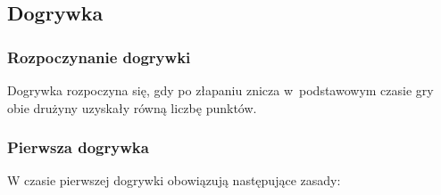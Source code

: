 \documentclass[12pt]{article}
\begin{document}
\subsection{Dogrywka}

\subsubsection{Rozpoczynanie dogrywki}
Dogrywka rozpoczyna się, gdy
po złapaniu znicza w~podstawowym czasie gry obie drużyny uzyskały równą
liczbę punktów.

\subsubsection{Pierwsza dogrywka}
W czasie pierwszej dogrywki
obowiązują następujące zasady:
\end{document}
